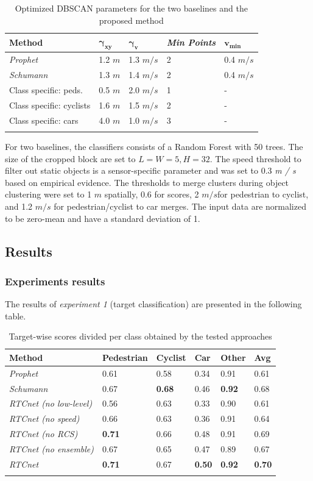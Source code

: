 \begin{longtable}[]{@{}lllll@{}}
\toprule
\textbf{Method} & \textbf{$\mathbold{\gamma_{xy}}$} & \textbf{$\mathbold{  \gamma_v}$} &
\textbf{\emph{Min Points}} & \textbf{$\mathbold{ v_{  min}}$}\tabularnewline
\midrule
\endhead
\emph{Prophet} & 1.2 $m$ & 1.3 $m / s$ & 2 & 0.4
$m / s$\tabularnewline
\emph{Schumann} & 1.3 $m$ & 1.4 $m / s$ & 2 & 0.4
$m / s$\tabularnewline
Class specific: peds. & 0.5 $m$ & 2.0 $m / s$ & 1 & -\tabularnewline
Class specific: cyclists & 1.6 $m$ & 1.5 $m / s$ & 2 &
-\tabularnewline
Class specific: cars & 4.0 $m$ & 1.0 $m / s$ & 3 & -\tabularnewline
\bottomrule
\caption{Optimized DBSCAN parameters for the two baselines and the proposed method}
\end{longtable}

For two baselines, the classifiers consists of a Random Forest with 50
trees. The size of the cropped block are set to $L = W = 5, H = 32$.
The speed threshold to filter out static objects is a sensor-specific
parameter and was set to 0.3 \emph{m / s} based on empirical evidence.
The thresholds to merge clusters during object clustering were set to 1
$m$ spatially, 0.6 for scores, 2 $m / s$for pedestrian to cyclist,
and 1.2 $m / s$ for pedestrian/cyclist to car merges. The input data
are normalized to be zero-mean and have a standard deviation of 1.

\newpage
\subsection{Results}\label{header-n439}

\subsubsection{Experiments results}\label{header-n440}

The results of \emph{experiment 1} (target classification) are presented
in the following table.

\begin{longtable}[]{@{}llllll@{}}
\toprule
\textbf{Method} & \textbf{Pedestrian} & \textbf{Cyclist} & \textbf{Car}
& \textbf{Other} & \textbf{Avg}\tabularnewline
\midrule
\endhead
\emph{Prophet} & 0.61 & 0.58 & 0.34 & 0.91 & 0.61\tabularnewline
\emph{Schumann} & 0.67 & \textbf{0.68} & 0.46 & \textbf{0.92} &
0.68\tabularnewline
\emph{RTCnet (no low-level)} & 0.56 & 0.63 & 0.33 & 0.90 &
0.61\tabularnewline
\emph{RTCnet (no speed)} & 0.66 & 0.63 & 0.36 & 0.91 &
0.64\tabularnewline
\emph{RTCnet (no RCS)} & \textbf{0.71} & 0.66 & 0.48 & 0.91 &
0.69\tabularnewline
\emph{RTCnet (no ensemble)} & 0.67 & 0.65 & 0.47 & 0.89 &
0.67\tabularnewline
\emph{RTCnet} & \textbf{0.71} & 0.67 & \textbf{0.50} & \textbf{0.92} &
\textbf{0.70}\tabularnewline
\bottomrule
\caption{Target-wise scores divided per class obtained by the tested approaches}
\end{longtable}

